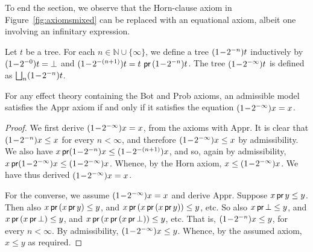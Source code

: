 To end the section, we observe that the Horn-clause axiom in Figure~\ref{fig:axiomsmixed} can be replaced with an equational axiom, albeit one involving an infinitary expression.



\begin{definition}
    \label{def:probaApproxConstruct}
    Let $t$ be a  tree. For each $n \in \mathbb{N} \cup \{\infty\}$, we define a tree $\Iter{t}{n}$ inductively by
    $\Iter{t}{0} = \bot$ and $\Iter{t}{(n+1)}  = t\,  \prEff \,\Iter{t}{n}$. The
    tree $\Iter{t}{\infty}$ is defined as $\bigsqcup_n \Iter{t}{n}$.
\end{definition}

\begin{proposition}%
\label{proposition:horn}
    For any effect theory containing the Bot and Prob axioms, an admissible model satisfies the $\text{Appr}$
     axiom if and only if it satisfies the equation 
    $\Iterx{\infty}= x$.
\end{proposition}

\begin{proof} We first derive $\Iterx{\infty}= x$, from the axioms with $\text{Appr}$.
    It is clear that $\Iterx{n} \leq  x$ for every $n < \infty$,
    and therefore $\Iterx{\infty} \leq  x$ by admissibility.
    We also have $x \prEff \Iterx{n} \leq  \Iterx{(n+1)}$,
    and so, again by admissibility, $x \prEff \Iterx{\infty} \leq \Iterx{\infty}$.
    Whence, by the Horn axiom, $x  \leq \Iterx{\infty}$. 
     We have thus derived $\Iterx{\infty}= x$.

    For the converse, we assume $\Iterx{\infty}= x$ and derive  $\text{Appr}$.
    Suppose $x \prEff y \leq y$.  Then also  $x \prEff \, (x \prEff y) \leq y$, and $x \prEff \, ( x \prEff \, (x \prEff y)) \leq y$, etc. So also $x \prEff \bot \leq y$, and $x \prEff \, (x \prEff \bot) \leq y$, and $x \prEff \, ( x \prEff \, (x \prEff \bot)) \leq y$,
 etc. That is, $\Iterx{n} \leq y$, for every $n < \infty$. By admissibility, $\Iterx{\infty} \leq y$. Whence, by the assumed axiom, $x \leq y$ as required.
 \end{proof}
